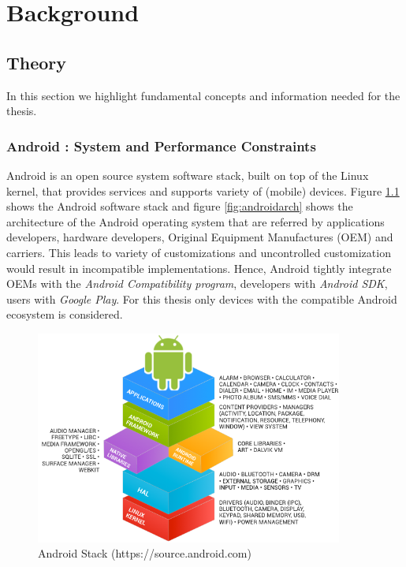 \chapter{Background}





\section{Theory }
In this section we highlight fundamental concepts and information needed for the thesis.
\subsection{Android : System and Performance Constraints}
Android\texttrademark{} is an open source system software stack, built on top of the Linux kernel, that provides services and supports variety of (mobile) devices. Figure \ref{fig:androidstack} shows the Android software stack  and figure  \ref{fig:androidarch} shows the architecture of the Android operating system that are referred by applications developers, hardware developers, Original Equipment Manufactures (OEM) and carriers. This leads to variety of customizations and uncontrolled customization would result in incompatible implementations. Hence, Android tightly integrate OEMs with the \textit{Android Compatibility program}, developers with \emph{Android SDK}, users with \emph{Google Play}. For this thesis only devices with the compatible Android ecosystem is considered.

\begin{figure}[h]	
	\centering
	\includegraphics[width=0.9\textwidth]{Figures/c1framework.png}
	\caption{Android Stack \small(https://source.android.com)}
	 \label{fig:androidstack}
\end{figure} 

